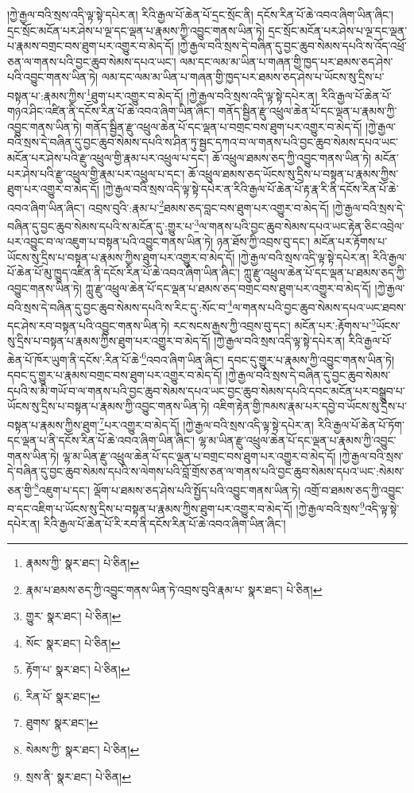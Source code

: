 །ཀྱེ་རྒྱལ་བའི་སྲས་འདི་ལྟ་སྟེ་དཔེར་ན། རིའི་རྒྱལ་པོ་ཆེན་པོ་དྲང་སྲོང་ནི། དངོས་རིན་པོ་ཆེ་འབའ་ཞིག་ཡིན་ཞིང་། དྲང་སྲོང་མངོན་པར་ཤེས་པ་ལྔ་དང་ལྡན་པ་རྣམས་ཀྱི་འབྱུང་གནས་ཡིན་ཏེ། དྲང་སྲོང་མངོན་པར་ཤེས་པ་ལྔ་དང་ལྡན་པ་རྣམས་བགྲང་བས་ཐུག་པར་འགྱུར་བ་མེད་དོ། །ཀྱེ་རྒྱལ་བའི་སྲས་དེ་བཞིན་དུ་བྱང་ཆུབ་སེམས་དཔའི་ས་འོད་འཕྲོ་ཅན་ལ་གནས་པའི་བྱང་ཆུབ་སེམས་དཔའ་ཡང་། ལམ་དང་ལམ་མ་ཡིན་པ་གཞན་གྱི་ཁྱད་པར་ཐམས་ཅད་ཤེས་པའི་འབྱུང་གནས་ཡིན་ཏེ། ལམ་དང་ལམ་མ་ཡིན་པ་གཞན་གྱི་ཁྱད་པར་ཐམས་ཅད་ཤེས་པ་ཡོངས་སུ་དྲིས་པ་བསྟན་པ་:རྣམས་ཀྱིས་\footnote{རྣམས་ཀྱི་  སྣར་ཐང་།  པེ་ཅིན། }ཐུག་པར་འགྱུར་བ་མེད་དོ། །ཀྱེ་རྒྱལ་བའི་སྲས་འདི་ལྟ་སྟེ་དཔེར་ན། རིའི་རྒྱལ་པོ་ཆེན་པོ་གཉའ་ཤིང་འཛིན་ནི་དངོས་རིན་པོ་ཆེ་འབའ་ཞིག་ཡིན་ཞིང་། གནོད་སྦྱིན་རྫུ་འཕྲུལ་ཆེན་པོ་དང་ལྡན་པ་རྣམས་ཀྱི་འབྱུང་གནས་ཡིན་ཏེ། གནོད་སྦྱིན་རྫུ་འཕྲུལ་ཆེན་པོ་དང་ལྡན་པ་བགྲང་བས་ཐུག་པར་འགྱུར་བ་མེད་དོ། །ཀྱེ་རྒྱལ་བའི་སྲས་དེ་བཞིན་དུ་བྱང་ཆུབ་སེམས་དཔའི་ས་ཤིན་ཏུ་སྦྱང་དཀའ་བ་ལ་གནས་པའི་བྱང་ཆུབ་སེམས་དཔའ་ཡང་མངོན་པར་ཤེས་པའི་རྫུ་འཕྲུལ་གྱི་རྣམ་པར་འཕྲུལ་པ་དང་། ཆོ་འཕྲུལ་ཐམས་ཅད་ཀྱི་འབྱུང་གནས་ཡིན་ཏེ། མངོན་པར་ཤེས་པའི་རྫུ་འཕྲུལ་གྱི་རྣམ་པར་འཕྲུལ་པ་དང་། ཆོ་འཕྲུལ་ཐམས་ཅད་ཡོངས་སུ་དྲིས་པ་བསྟན་པ་རྣམས་ཀྱིས་ཐུག་པར་འགྱུར་བ་མེད་དོ། །ཀྱེ་རྒྱལ་བའི་སྲས་འདི་ལྟ་སྟེ་དཔེར་ན་རིའི་རྒྱལ་པོ་ཆེན་པོ་རྟ་རྣ་རི་ནི་དངོས་རིན་པོ་ཆེ་འབའ་ཞིག་ཡིན་ཞིང་། འབྲས་བུའི་:རྣམ་པ་\footnote{རྣམ་པ་ཐམས་ཅད་ཀྱི་འབྱུང་གནས་ཡིན་ཏེ་འབྲས་བུའི་རྣམ་པ་  སྣར་ཐང་།  པེ་ཅིན། }ཐམས་ཅད་བླང་བས་ཐུག་པར་འགྱུར་བ་མེད་དོ། །ཀྱེ་རྒྱལ་བའི་སྲས་དེ་བཞིན་དུ་བྱང་ཆུབ་སེམས་དཔའི་ས་མངོན་དུ་:གྱུར་པ་\footnote{གྱུར་  སྣར་ཐང་།  པེ་ཅིན། }ལ་གནས་པའི་བྱང་ཆུབ་སེམས་དཔའ་ཡང་རྟེན་ཅིང་འབྲེལ་པར་འབྱུང་བ་ལ་འཇུག་པ་བསྟན་པའི་འབྱུང་གནས་ཡིན་ཏེ། ཉན་ཐོས་ཀྱི་འབྲས་བུ་དང་། མངོན་པར་རྟོགས་པ་ཡོངས་སུ་དྲིས་པ་བསྟན་པ་རྣམས་ཀྱིས་ཐུག་པར་འགྱུར་བ་མེད་དོ། །ཀྱེ་རྒྱལ་བའི་སྲས་འདི་ལྟ་སྟེ་དཔེར་ན། རིའི་རྒྱལ་པོ་ཆེན་པོ་མུ་ཁྱུད་འཛིན་ནི་དངོས་རིན་པོ་ཆེ་འབའ་ཞིག་ཡིན་ཞིང་། ཀླུ་རྫུ་འཕྲུལ་ཆེན་པོ་དང་ལྡན་པ་ཐམས་ཅད་ཀྱི་འབྱུང་གནས་ཡིན་ཏེ། ཀླུ་རྫུ་འཕྲུལ་ཆེན་པོ་དང་ལྡན་པ་ཐམས་ཅད་བགྲང་བས་ཐུག་པར་འགྱུར་བ་མེད་དོ། །ཀྱེ་རྒྱལ་བའི་སྲས་དེ་བཞིན་དུ་བྱང་ཆུབ་སེམས་དཔའི་ས་རིང་དུ་:སོང་བ་\footnote{སོང་  སྣར་ཐང་།  པེ་ཅིན། }ལ་གནས་པའི་བྱང་ཆུབ་སེམས་དཔའ་ཡང་ཐབས་དང་ཤེས་རབ་བསྟན་པའི་འབྱུང་གནས་ཡིན་ཏེ། རང་སངས་རྒྱས་ཀྱི་འབྲས་བུ་དང་། མངོན་པར་:རྟོགས་པ་\footnote{རྟོག་པ་  སྣར་ཐང་།  པེ་ཅིན། }ཡོངས་སུ་དྲིས་པ་བསྟན་པ་རྣམས་ཀྱིས་ཐུག་པར་འགྱུར་བ་མེད་དོ། །ཀྱེ་རྒྱལ་བའི་སྲས་འདི་ལྟ་སྟེ་དཔེར་ན། རིའི་རྒྱལ་པོ་ཆེན་པོ་ཁོར་ཡུག་ནི་དངོས་:རིན་པོ་ཆེ་\footnote{རིན་པོ་  སྣར་ཐང་། }འབའ་ཞིག་ཡིན་ཞིང་། དབང་དུ་གྱུར་པ་རྣམས་ཀྱི་འབྱུང་གནས་ཡིན་ཏེ། དབང་དུ་གྱུར་པ་རྣམས་བགྲང་བས་ཐུག་པར་འགྱུར་བ་མེད་དོ། །ཀྱེ་རྒྱལ་བའི་སྲས་དེ་བཞིན་དུ་བྱང་ཆུབ་སེམས་དཔའི་ས་མི་གཡོ་བ་ལ་གནས་པའི་བྱང་ཆུབ་སེམས་དཔའ་ཡང་བྱང་ཆུབ་སེམས་དཔའི་དབང་མངོན་པར་བསྒྲུབ་པ་ཡོངས་སུ་དྲིས་པ་བསྟན་པ་རྣམས་ཀྱི་འབྱུང་གནས་ཡིན་ཏེ། འཇིག་རྟེན་གྱི་ཁམས་རྣམ་པར་དབྱེ་བ་ཡོངས་སུ་དྲིས་པ་བསྟན་པ་རྣམས་ཀྱིས་ཐུག་\footnote{ཐུགས་  སྣར་ཐང་། }པར་འགྱུར་བ་མེད་དོ། །ཀྱེ་རྒྱལ་བའི་སྲས་འདི་ལྟ་སྟེ་དཔེར་ན། རིའི་རྒྱལ་པོ་ཆེན་པོ་ཏོག་དང་ལྡན་པ་ནི་དངོས་རིན་པོ་ཆེ་འབའ་ཞིག་ཡིན་ཞིང་། ལྷ་མ་ཡིན་རྫུ་འཕྲུལ་ཆེན་པོ་དང་ལྡན་པ་རྣམས་ཀྱི་འབྱུང་གནས་ཡིན་ཏེ། ལྷ་མ་ཡིན་རྫུ་འཕྲུལ་ཆེན་པོ་དང་ལྡན་པ་བགྲང་བས་ཐུག་པར་འགྱུར་བ་མེད་དོ། །ཀྱེ་རྒྱལ་བའི་སྲས་དེ་བཞིན་དུ་བྱང་ཆུབ་སེམས་དཔའི་ས་ལེགས་པའི་བློ་གྲོས་ཅན་ལ་གནས་པའི་བྱང་ཆུབ་སེམས་དཔའ་ཡང་:སེམས་ཅན་གྱི་\footnote{སེམས་ཀྱི་  སྣར་ཐང་།  པེ་ཅིན། }འཇུག་པ་དང་། ལྡོག་པ་ཐམས་ཅད་ཤེས་པའི་སྤྱོད་པའི་འབྱུང་གནས་ཡིན་ཏེ། འགྲོ་བ་ཐམས་ཅད་ཀྱི་འབྱུང་བ་དང་འཇིག་པ་ཡོངས་སུ་དྲིས་པ་བསྟན་པ་རྣམས་ཀྱིས་ཐུག་པར་འགྱུར་བ་མེད་དོ། །ཀྱེ་རྒྱལ་བའི་སྲས་\footnote{སྲས་ནི་  སྣར་ཐང་།  པེ་ཅིན། }འདི་ལྟ་སྟེ་དཔེར་ན། རིའི་རྒྱལ་པོ་ཆེན་པོ་རི་རབ་ནི་དངོས་རིན་པོ་ཆེ་འབའ་ཞིག་ཡིན་ཞིང་། 